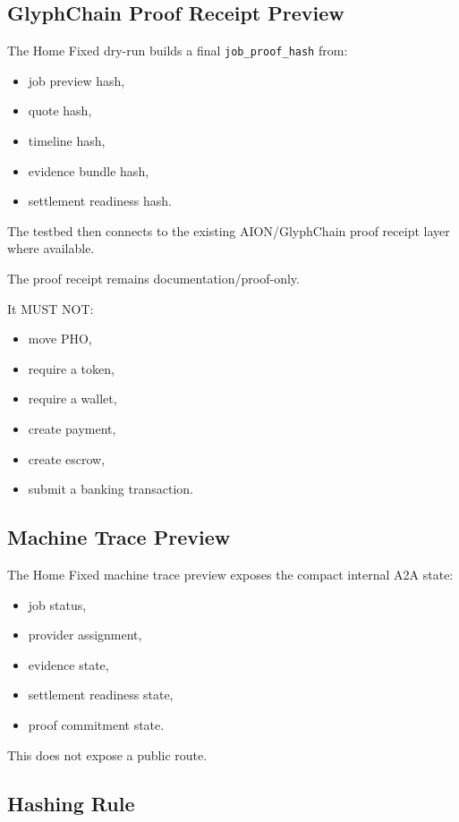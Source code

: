 \subsection{GlyphChain Proof Receipt Preview}

The Home Fixed dry-run builds a final \texttt{job\_proof\_hash} from:

\begin{itemize}
  \item job preview hash,
  \item quote hash,
  \item timeline hash,
  \item evidence bundle hash,
  \item settlement readiness hash.
\end{itemize}

The testbed then connects to the existing AION/GlyphChain proof receipt layer where available.

The proof receipt remains documentation/proof-only.

It MUST NOT:

\begin{itemize}
  \item move PHO,
  \item require a token,
  \item require a wallet,
  \item create payment,
  \item create escrow,
  \item submit a banking transaction.
\end{itemize}

\subsection{Machine Trace Preview}

The Home Fixed machine trace preview exposes the compact internal A2A state:

\begin{itemize}
  \item job status,
  \item provider assignment,
  \item evidence state,
  \item settlement readiness state,
  \item proof commitment state.
\end{itemize}

This does not expose a public route.

\subsection{Hashing Rule}

